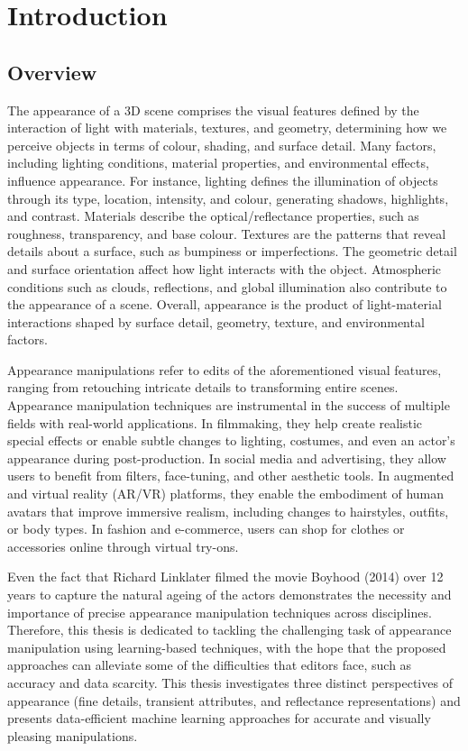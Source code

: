 \chapter{Introduction}






\section{Overview} 

The appearance of a 3D scene comprises the visual features defined by the interaction of light with materials, textures, and geometry, determining how we perceive objects in terms of colour, shading, and surface detail. Many factors, including lighting conditions, material properties, and environmental effects, influence appearance. For instance, lighting defines the illumination of objects through its type, location, intensity, and colour, generating shadows, highlights, and contrast. Materials describe the optical/reflectance properties, such as roughness, transparency, and base colour. Textures are the patterns that reveal details about a surface, such as bumpiness or imperfections. The geometric detail and surface orientation affect how light interacts with the object. Atmospheric conditions such as clouds, reflections, and global illumination also contribute to the appearance of a scene. Overall, appearance is the product of light-material interactions shaped by surface detail, geometry, texture, and environmental factors.
 
Appearance manipulations refer to edits of the aforementioned visual features, ranging from retouching intricate details to transforming entire scenes. Appearance manipulation techniques are instrumental in the success of multiple fields with real-world applications. In filmmaking, they help create realistic special effects or enable subtle changes to lighting, costumes, and even an actor’s appearance during post-production. In social media and advertising, they allow users to benefit from filters, face-tuning, and other aesthetic tools. In augmented and virtual reality (AR/VR) platforms, they enable the embodiment of human avatars that improve immersive realism, including changes to hairstyles, outfits, or body types. In fashion and e-commerce, users can shop for clothes or accessories online through virtual try-ons.

Even the fact that Richard Linklater filmed the movie Boyhood (2014) over 12 years to capture the natural ageing of the actors demonstrates the necessity and importance of precise appearance manipulation techniques across disciplines. Therefore, this thesis is dedicated to tackling the challenging task of appearance manipulation using learning-based techniques, with the hope that the proposed approaches can alleviate some of the difficulties that editors face, such as accuracy and data scarcity. This thesis investigates three distinct perspectives of appearance (fine details, transient attributes, and reflectance representations) and presents data-efficient machine learning approaches for accurate and visually pleasing manipulations.

